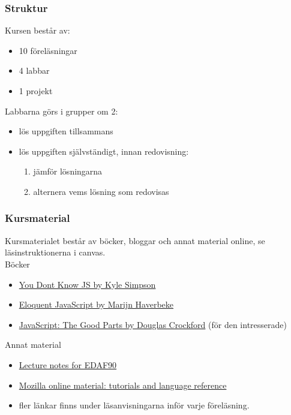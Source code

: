 \documentclass[aspectratio=1610]{beamer}
\begin{document}
\begin{frame}
  \frametitle{Struktur}
Kursen består av:
\begin{itemize}
  \item 10 föreläsningar
  \item 4 labbar
  \item 1 projekt
\end{itemize}
\vspace{2mm}
Labbarna görs i grupper om 2:
\begin{itemize}
 \item lös uppgiften tillsammans
 \item lös uppgiften självständigt, innan redovisning:
   \begin{enumerate}
     \item jämför lösningarna
     \item alternera vems lösning som redovisas
   \end{enumerate}
\end{itemize}
\end{frame}

\begin{frame}
  \frametitle{Kursmaterial}

Kursmaterialet består av böcker, bloggar och annat material online, se läsinstruktionerna i canvas.
\\ \vspace{3mm}
Böcker
\begin{itemize}
\item \href{https://github.com/getify/You-Dont-Know-JS}{You Dont Know JS by Kyle Simpson} 
\item \href{https://eloquentjavascript.net/}{Eloquent JavaScript by Marijn Haverbeke}
\item \href{http://shop.oreilly.com/product/9780596517748.do}{JavaScript: The Good Parts by Douglas Crockford} (för den intresserade)
\end{itemize}

Annat material
\begin{itemize}
\item \href{http://fileadmin.cs.lth.se/cs/Education/EDAF90/lectures/lecture-notes.pdf}{Lecture notes for EDAF90}
\item \href{https://developer.mozilla.org/en-US/docs/Learn}{Mozilla online material: tutorials and language reference}
\item fler länkar finns under läsanvisningarna inför varje föreläsning.
\end{itemize}

\end{frame}
\end{document}
